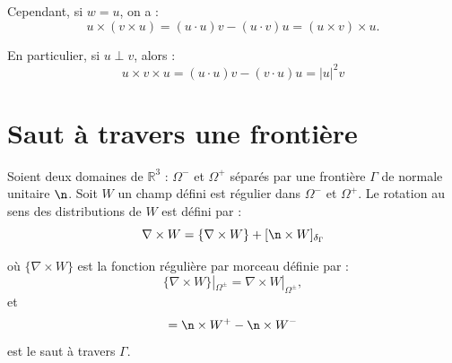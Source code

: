 Cependant, si $w = u$, on a :
\begin{equation}
    u\times(v\times u) = (u\cdot u)v - (u\cdot v)u = (u\times v)\times u.
\end{equation}

En particulier, si $u\perp v$, alors :
\begin{equation}
    u\times v\times u = (u\cdot u)v - (v\cdot u)u = |u|^2 v
    \label{eq:prodvec}
\end{equation}

\section{Saut à  travers une frontière}

Soient deux domaines de $\mathbb R^3$ :  $\Omega^-$ et $\Omega^+$ séparés par une frontière $\Gamma$ de normale unitaire $\n$. Soit $W$ un champ défini est régulier dans $\Omega^-$ et $\Omega^+$. Le rotation au sens des distributions de $W$ est défini par :
\begin{equation}
    \nabla\times W = \{\nabla\times W\} + [\n\times W]_{\delta_\Gamma}
    \label{app-eq:rot}
\end{equation}

où $ \{\nabla\times W\}$ est la fonction régulière par morceau définie par :
\begin{equation}
     \{\nabla\times W\}|_{\Omega^\pm} = \nabla\times W|_{\Omega^\pm},
\end{equation}
%
et 
\begin{equation}    
    [\n\times W] = \n\times W^+ - \n\times W^-
\end{equation}
est le saut à travers $\Gamma$.